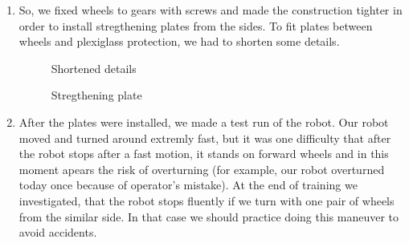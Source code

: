 \begin{enumerate}
\begin{enumerate}
		\item So, we fixed wheels to gears with screws and made the construction tighter in order to install stregthening plates from the sides. To fit plates between wheels and plexiglass protection, we had to shorten some details.
		\begin{figure}[H]
			\begin{minipage}[h]{0.37\linewidth}
				\caption{Shortened details}
			\end{minipage}
			\hfill
			\begin{minipage}[h]{0.57\linewidth}
				\caption{Stregthening plate}
			\end{minipage}
		\end{figure}
		
		
        \item After the plates were installed, we made a test run of the robot. Our robot moved and turned around extremly fast, but it was one difficulty that after the robot stops after a fast motion, it stands on forward wheels and in this moment apears the risk of overturning (for example, our robot overturned today once because of operator's mistake). At the end of training we investigated, that the robot stops fluently if we turn with one pair of wheels from the similar side. In that case we should practice doing this maneuver to avoid accidents.
		

\end{enumerate}
\end{enumerate}
